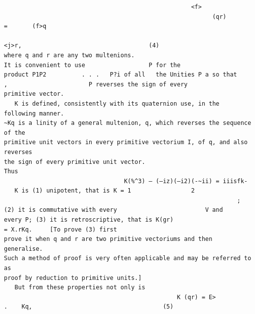 \documentclass[10pt]{article}
\begin{document}
\begin{verbatim}
                                                     <f>
                                                           (qr)       =       (f>q
                                                                                         <j>r,                                    (4)
where q and r are any two multenions.                                            It is convenient to use                  P for the
product P1P2          . . .   P?i of all   the Unities P a so that        ,                       P reverses the sign of every
primitive vector.
   K is defined, consistently with its quaternion use, in the following manner.
~Kq is a linity of a general multenion, q, which reverses the sequence of the
primitive unit vectors in every primitive vectorium I, of q, and also reverses
the sign of every primitive unit vector.                                        Thus
                                  K(%^3) — (—iz)(—i2)(-~ii) = iiisfk-
   K is (1) unipotent, that is K = 1                 2
                                                                  ;   (2) it is commutative with every                         V and
every P; (3) it is retroscriptive, that is K(gr)                                                 = X.rKq.     [To prove (3) first
prove it when q and r are two primitive vectoriums and then generalise.
Such a method of proof is very often applicable and may be referred to as
proof by reduction to primitive units.]
   But from these properties not only is
                                                 K (qr) = E>                         .    Kq,                                     (5)


\end{verbatim}
\clearpage
\end{document}
